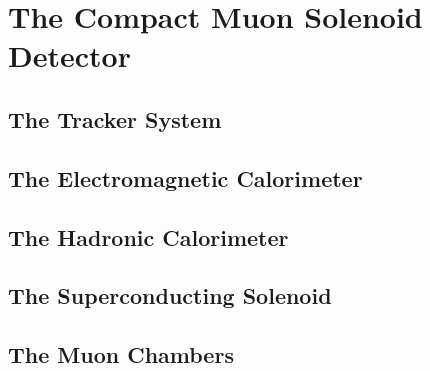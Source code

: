 \section{The Compact Muon Solenoid Detector}
\subsection{The Tracker System}
\subsection{The Electromagnetic Calorimeter}
\subsection{The Hadronic Calorimeter}
\subsection{The Superconducting Solenoid}
\subsection{The Muon Chambers}